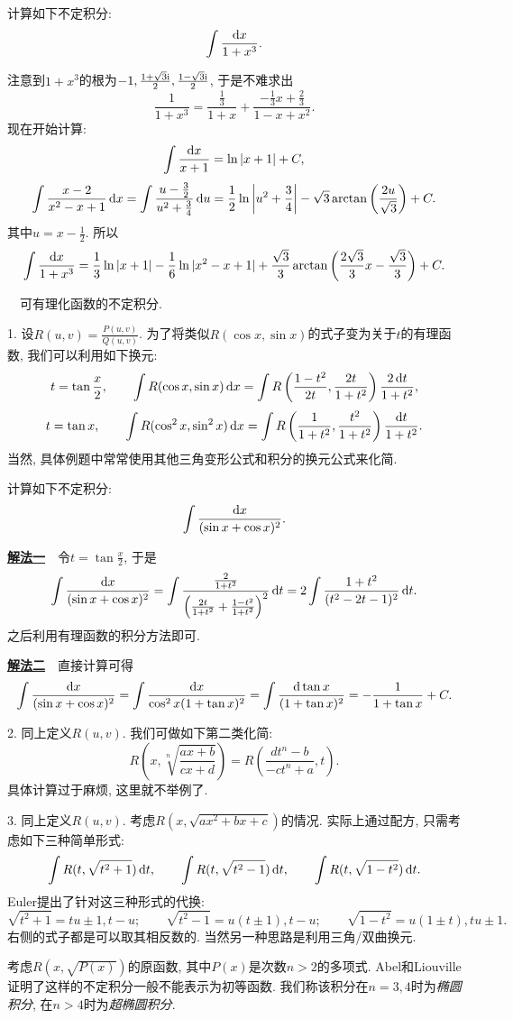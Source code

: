\begin{example}
	计算如下不定积分: $$\int \frac{\mathop{}\!\mathrm{d} x}{1+x^3}. $$
\end{example}
\begin{solution}
	注意到$1+x^3$的根为$-1,\frac{1+\sqrt{3}\mathrm{i}}{2},\frac{1-\sqrt{3}\mathrm{i}}{2}$, 于是不难求出$$\frac{1}{1+x^3} = \frac{\frac{1}{3}}{1+x} + \frac{-\frac{1}{3}x+\frac{2}{3}}{1-x+x^2}. $$
	现在开始计算: $$\int \frac{\mathop{}\!\mathrm{d} x}{x+1} = \ln |x+1| + C,$$
	$$\int \frac{x-2}{x^2-x+1} \mathop{}\!\mathrm{d} x = \int \frac{u-\frac{3}{2}}{u^2+\frac{3}{4}} \mathop{}\!\mathrm{d} u = \frac{1}{2} \ln \left|u^2+\frac{3}{4} \right| -\sqrt{3} \arctan \left( \frac{2u}{\sqrt{3}} \right) + C.$$
	其中$u=x-\frac{1}{2}$. 所以$$\int \frac{\mathop{}\!\mathrm{d} x}{1+x^3} = \frac{1}{3} \ln |x+1| - \frac{1}{6} \ln |x^2-x+1| + \frac{\sqrt{3}}{3}\arctan \left( \frac{2\sqrt{3}}{3}x-\frac{\sqrt{3}}{3} \right)+C.$$
\end{solution}

~~可有理化函数的不定积分. 

1. 设$R(u,v)=\frac{P(u,v)}{Q(u,v)}$. 为了将类似$R(\cos x,\sin x)$的式子变为关于$t$的有理函数, 我们可以利用如下换元: 
$$t=\tan \frac{x}{2},\qquad \int R(\cos x,\sin x) \mathop{}\!\mathrm{d} x = \int R\left( \frac{1-t^2}{2t},\frac{2t}{1+t^2} \right) \frac{2\mathop{}\!\mathrm{d} t}{1+t^2}, $$
$$t=\tan x,\qquad \int R(\cos ^2 x,\sin ^2 x) \mathop{}\!\mathrm{d} x = \int R\left( \frac{1}{1+t^2},\frac{t^2}{1+t^2} \right) \frac{\mathop{}\!\mathrm{d} t}{1+t^2}. $$
当然, 具体例题中常常使用其他三角变形公式和积分的换元公式来化简. 

\begin{example}
	计算如下不定积分: $$\int \frac{\mathop{}\!\mathrm{d} x}{(\sin x + \cos x)^2}. $$
\end{example}
\begin{solution}
	\underline{\textbf{解法一}}~~令$t=\tan \frac{x}{2}$, 于是$$\int \frac{\mathop{}\!\mathrm{d} x}{(\sin x + \cos x)^2} = \int \frac{\frac{2}{1+t^2}}{\left( \frac{2t}{1+t^2} + \frac{1-t^2}{1+t^2} \right)^2} \mathop{}\!\mathrm{d} t = 2\int \frac{1+t^2}{(t^2-2t-1)^2} \mathop{}\!\mathrm{d} t. $$
	之后利用有理函数的积分方法即可. 
	
	\underline{\textbf{解法二}}~~直接计算可得$$\int \frac{\mathop{}\!\mathrm{d} x}{(\sin x + \cos x)^2} = \int \frac{\mathop{}\!\mathrm{d} x}{\cos ^2x (1+\tan x)^2} = \int \frac{\mathop{}\!\mathrm{d} \tan x}{(1+\tan x)^2} = -\frac{1}{1+\tan x}+C.$$
\end{solution}

2. 同上定义$R(u,v)$. 我们可做如下第二类化简: $$R\left( x,\sqrt[n]{\frac{ax+b}{cx+d}} \right) = R\left( \frac{dt^n-b}{-ct^n+a},t \right). $$
具体计算过于麻烦, 这里就不举例了. 

3. 同上定义$R(u,v)$. 考虑$R(x,\sqrt{ax^2+bx+c})$的情况. 实际上通过配方, 只需考虑如下三种简单形式: $$\int R(t,\sqrt{t^2+1}) \mathop{}\!\mathrm{d} t, \qquad \int R(t,\sqrt{t^2-1}) \mathop{}\!\mathrm{d} t, \qquad \int R(t,\sqrt{1-t^2}) \mathop{}\!\mathrm{d} t. $$
Euler提出了针对这三种形式的代换: $$\sqrt{t^2+1}=tu\pm 1,t-u;\qquad \sqrt{t^2-1}=u(t\pm 1),t-u;\qquad \sqrt{1-t^2}=u(1\pm t),tu\pm 1. $$
右侧的式子都是可以取其相反数的. 当然另一种思路是利用三角/双曲换元. 
\begin{remark}
	考虑$R(x,\sqrt{P(x)})$的原函数, 其中$P(x)$是次数$n>2$的多项式. Abel和Liouville证明了这样的不定积分一般不能表示为初等函数. 我们称该积分在$n=3,4$时为\textit{椭圆积分}, 在$n>4$时为\textit{超椭圆积分}. 
\end{remark}


